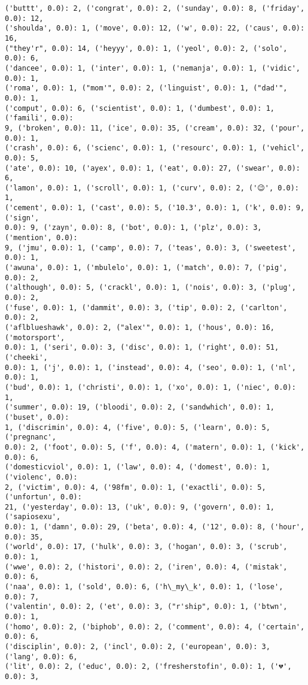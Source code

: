 \documentclass[11pt]{article}
\begin{document}
\begin{Verbatim}[commandchars=\\\{\}]
('buttt', 0.0): 2, ('congrat', 0.0): 2, ('sunday', 0.0): 8, ('friday', 0.0): 12,
('shoulda', 0.0): 1, ('move', 0.0): 12, ('w', 0.0): 22, ('caus', 0.0): 16,
("they'r", 0.0): 14, ('heyyy', 0.0): 1, ('yeol', 0.0): 2, ('solo', 0.0): 6,
('dancee', 0.0): 1, ('inter', 0.0): 1, ('nemanja', 0.0): 1, ('vidic', 0.0): 1,
('roma', 0.0): 1, ("mom'", 0.0): 2, ('linguist', 0.0): 1, ("dad'", 0.0): 1,
('comput', 0.0): 6, ('scientist', 0.0): 1, ('dumbest', 0.0): 1, ('famili', 0.0):
9, ('broken', 0.0): 11, ('ice', 0.0): 35, ('cream', 0.0): 32, ('pour', 0.0): 1,
('crash', 0.0): 6, ('scienc', 0.0): 1, ('resourc', 0.0): 1, ('vehicl', 0.0): 5,
('ate', 0.0): 10, ('ayex', 0.0): 1, ('eat', 0.0): 27, ('swear', 0.0): 6,
('lamon', 0.0): 1, ('scroll', 0.0): 1, ('curv', 0.0): 2, ('😉', 0.0): 1,
('cement', 0.0): 1, ('cast', 0.0): 5, ('10.3', 0.0): 1, ('k', 0.0): 9, ('sign',
0.0): 9, ('zayn', 0.0): 8, ('bot', 0.0): 1, ('plz', 0.0): 3, ('mention', 0.0):
9, ('jmu', 0.0): 1, ('camp', 0.0): 7, ('teas', 0.0): 3, ('sweetest', 0.0): 1,
('awuna', 0.0): 1, ('mbulelo', 0.0): 1, ('match', 0.0): 7, ('pig', 0.0): 2,
('although', 0.0): 5, ('crackl', 0.0): 1, ('nois', 0.0): 3, ('plug', 0.0): 2,
('fuse', 0.0): 1, ('dammit', 0.0): 3, ('tip', 0.0): 2, ('carlton', 0.0): 2,
('aflblueshawk', 0.0): 2, ("alex'", 0.0): 1, ('hous', 0.0): 16, ('motorsport',
0.0): 1, ('seri', 0.0): 3, ('disc', 0.0): 1, ('right', 0.0): 51, ('cheeki',
0.0): 1, ('j', 0.0): 1, ('instead', 0.0): 4, ('seo', 0.0): 1, ('nl', 0.0): 1,
('bud', 0.0): 1, ('christi', 0.0): 1, ('xo', 0.0): 1, ('niec', 0.0): 1,
('summer', 0.0): 19, ('bloodi', 0.0): 2, ('sandwhich', 0.0): 1, ('buset', 0.0):
1, ('discrimin', 0.0): 4, ('five', 0.0): 5, ('learn', 0.0): 5, ('pregnanc',
0.0): 2, ('foot', 0.0): 5, ('f', 0.0): 4, ('matern', 0.0): 1, ('kick', 0.0): 6,
('domesticviol', 0.0): 1, ('law', 0.0): 4, ('domest', 0.0): 1, ('violenc', 0.0):
2, ('victim', 0.0): 4, ('98fm', 0.0): 1, ('exactli', 0.0): 5, ('unfortun', 0.0):
21, ('yesterday', 0.0): 13, ('uk', 0.0): 9, ('govern', 0.0): 1, ('sapiosexu',
0.0): 1, ('damn', 0.0): 29, ('beta', 0.0): 4, ('12', 0.0): 8, ('hour', 0.0): 35,
('world', 0.0): 17, ('hulk', 0.0): 3, ('hogan', 0.0): 3, ('scrub', 0.0): 1,
('wwe', 0.0): 2, ('histori', 0.0): 2, ('iren', 0.0): 4, ('mistak', 0.0): 6,
('naa', 0.0): 1, ('sold', 0.0): 6, ('h\_my\_k', 0.0): 1, ('lose', 0.0): 7,
('valentin', 0.0): 2, ('et', 0.0): 3, ("r'ship", 0.0): 1, ('btwn', 0.0): 1,
('homo', 0.0): 2, ('biphob', 0.0): 2, ('comment', 0.0): 4, ('certain', 0.0): 6,
('disciplin', 0.0): 2, ('incl', 0.0): 2, ('european', 0.0): 3, ('lang', 0.0): 6,
('lit', 0.0): 2, ('educ', 0.0): 2, ('fresherstofin', 0.0): 1, ('💔', 0.0): 3,

\end{Verbatim}
\end{document}
